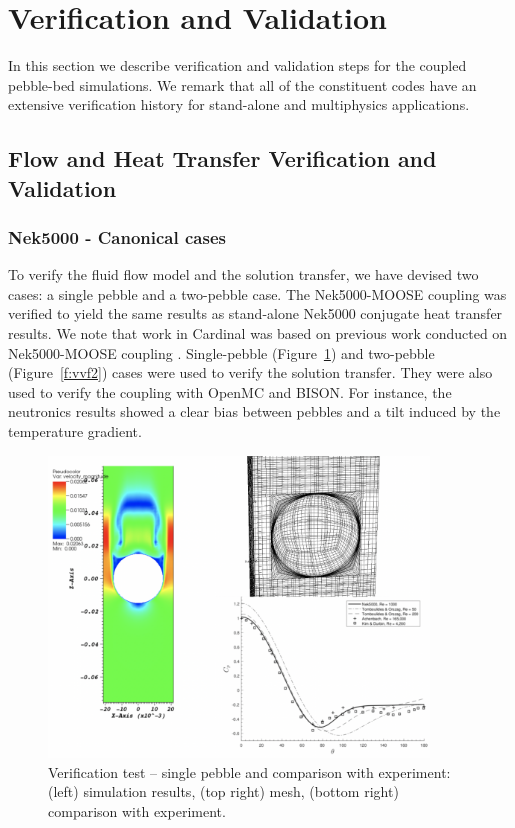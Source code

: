 \section{Verification and Validation}
\label{ss:c3}

In this section we describe verification and validation steps for the coupled
pebble-bed simulations.  We remark that all of the constituent codes have an
extensive verification history for stand-alone and multiphysics applications.

\subsection{Flow and Heat Transfer Verification and Validation}

\subsubsection{Nek5000 - Canonical cases}
To verify the fluid flow model and the solution transfer, we have devised two cases: a single pebble and a two-pebble case. The Nek5000-MOOSE coupling was verified to yield the same results as stand-alone Nek5000 conjugate heat transfer results. We note that work in Cardinal was based on previous work conducted on Nek5000-MOOSE coupling \cite{novak2018preliminary}. Single-pebble (Figure~\ref{f:vvf1}) and two-pebble (Figure~\ref{f:vvf2}) cases were used to verify the solution transfer. They were also used to verify the coupling with OpenMC and BISON. For instance, the neutronics results showed a clear bias between pebbles and a tilt induced by the temperature gradient.

\begin{figure}[!h]
\centering
\includegraphics[clip=true,width=0.9\textwidth]{Figures/pp_vv1a}
\caption{Verification test -- single pebble and comparison with experiment: (left) simulation results, (top right) mesh, (bottom right) comparison with experiment.}
\label{f:vvf1}
\end{figure}

